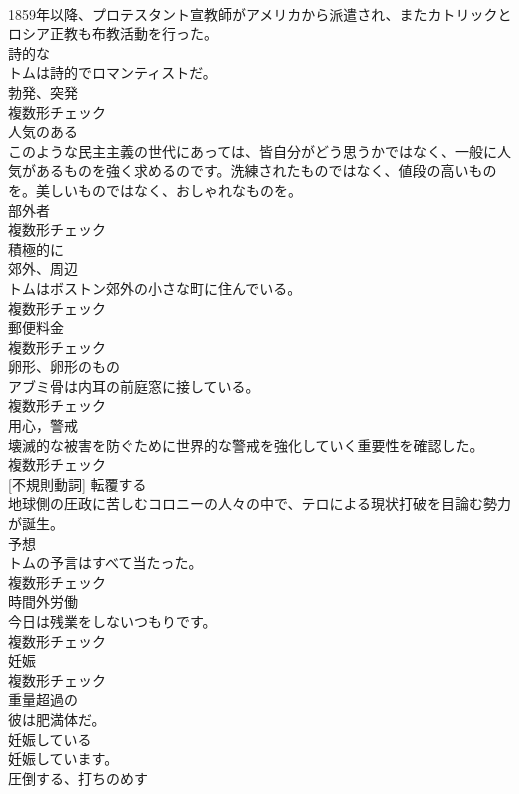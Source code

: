 \documentclass[8pt]{extreport}
\begin{document}
\begin{CJK}{UTF8}{min}
\\	1859年以降、プロテスタント宣教師がアメリカから派遣され、またカトリックとロシア正教も布教活動を行った。	
\\	[形容詞]	詩的な	
\\	トムは詩的でロマンティストだ。	
\\	[名詞]	勃発、突発	
\\	複数形チェック
\\	[副詞]	人気のある	
\\	このような民主主義の世代にあっては、皆自分がどう思うかではなく、一般に人気があるものを強く求めるのです。洗練されたものではなく、値段の高いものを。美しいものではなく、おしゃれなものを。	
\\	[名詞]	部外者	
\\	複数形チェック
\\	[副詞]	積極的に	
\\	[名詞]	郊外、周辺	
\\	トムはボストン郊外の小さな町に住んでいる。	
\\	複数形チェック
\\	[名詞]	郵便料金	
\\	複数形チェック
\\	[名詞]	卵形、卵形のもの	
\\	アブミ骨は内耳の前庭窓に接している。	
\\	複数形チェック
\\	[名詞]	用心，警戒	
\\	壊滅的な被害を防ぐために世界的な警戒を強化していく重要性を確認した。	
\\	複数形チェック
\\	[動詞] [不規則動詞]	転覆する	
\\	地球側の圧政に苦しむコロニーの人々の中で、テロによる現状打破を目論む勢力が誕生。	
\\	[名詞]	予想	
\\	トムの予言はすべて当たった。	
\\	複数形チェック
\\	[名詞]	時間外労働	
\\	今日は残業をしないつもりです。	
\\	複数形チェック
\\	[名詞]	妊娠	
\\	複数形チェック
\\	[形容詞]	重量超過の	
\\	彼は肥満体だ。	
\\	[形容詞]	妊娠している	
\\	妊娠しています。	
\\	[動詞]	圧倒する、打ちのめす	

\end{CJK}
\end{document}
